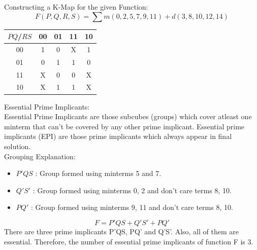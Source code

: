 \documentclass[12pt]{article}
\begin{document}
Constructing a K-Map for the given Function: 
 $$ F(P,Q,R,S)=\sum m(0,2,5,7,9,11)+d(3,8,10,12,14) $$
 \begin{center}

\renewcommand{\arraystretch}{1.8}

\begin{tabular}{|c|c|c|c|c|}
\hline
{$PQ$}/{$RS$} & 00 & 01 & 11 & 10 \\
\hline

00 &
1 &
0 &
X &
1 \\
\hline

01 &
0 &
1 &
1 &
0 \\
\hline
11 &
X &
0 &
0 &
X \\
\hline
10 &
X &
1 &
1 &
X \\
\hline
\end{tabular}
\end{center}
Essential Prime Implicants:\\
Essential Prime Implicants are those subcubes (groups) which cover atleast one minterm that can’t be covered by any other prime implicant. Essential prime implicants (EPI) are those prime implicants which always appear in final solution.\\
Grouping Explanation:
\begin{itemize}
    \item {$P'QS$} : Group formed using minterms 5 and 7.
    
    \item {$Q'S'$} : Group formed using minterms 0, 2 and don't care terms 8, 10.
    
    \item {$PQ'$} : Group formed using minterms 9, 11 and don't care terms 8, 10.
\end{itemize}
$$
F = P'QS + Q'S' + PQ'
$$
There are three prime implicants P'QS, PQ' and Q'S'. Also, all of them are essential. Therefore, the number of essential prime implicants of function F is
3.
\end{document}
